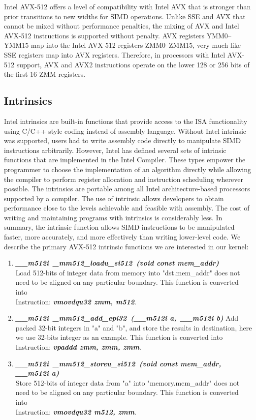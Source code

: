 \documentclass[sigconf]{acmart}
\begin{document}
Intel AVX-512 offers a level of compatibility with Intel AVX that is stronger than
prior transitions to new widths for SIMD operations. Unlike SSE and AVX that cannot
be mixed without performance penalties, the mixing of AVX and Intel AVX-512 instructions
is supported without penalty. AVX registers YMM0–YMM15 map into the Intel AVX-512 registers
ZMM0–ZMM15, very much like SSE registers map into AVX registers. Therefore, in processors with
Intel AVX-512 support, AVX and AVX2 instructions operate on the lower 128 or 256 bits of the first 16 ZMM registers.

\subsection{Intrinsics}
Intel intrinsics are built-in functions that provide access to the ISA functionality
using C/C++ style coding instead of assembly language. Without Intel intrinsic was
supported, users had to write assembly code directly to manipulate SIMD
instructions arbitrarily.
However, Intel has defined several sets of intrinsic functions that are implemented
in the Intel Compiler. These types empower the programmer to choose the implementation
of an algorithm directly while allowing the compiler to perform register allocation
and instruction scheduling wherever possible. The intrinsics are portable among all
Intel architecture-based processors supported by a compiler. The use of intrinsic
allows developers to obtain performance close to the levels achievable and feasible with assembly.
The cost of writing and maintaining programs with intrinsics is considerably less.
In summary, the intrinsic function allows SIMD instructions to be manipulated faster, more
accurately, and more effectively than writing lower-level code.
We describe the primary AVX-512 intrinsic functions we are interested in our kernel:

\begin{enumerate}
  \item \emph{\textbf{\textit{\_\_m512i\ \_mm512\_loadu\_si512\ (void const\* mem\_addr)}}} \\
  Load 512-bits of integer data from memory into "dst.mem\_addr" does not need to be aligned on any particular boundary.
  This function is converted into \\ Instruction: \emph{\textbf{\textit{vmovdqu32  zmm,  m512}}}.
  \item \emph{\textbf{\textit{\_\_m512i\ \_mm512\_add\_epi32\ (\_\_m512i a,\ \_\_m512i b)}}}
  Add packed 32-bit integers in "a" and "b", and store the results in destination, here we use 32-bits integer as an example.
  This function is converted into \\ Instruction: \emph{\textbf{\textit{vpaddd  zmm,  zmm,  zmm}}}.
  \item \emph{\textbf{\textit{\_\_m512i\ \_mm512\_storeu\_si512\ (void const\* mem\_addr, \_\_m512i a)}}} \\
  Store 512-bits of integer data from "a" into "memory.mem\_addr" does not need to be aligned on any particular boundary.
  This function is converted into \\ Instruction: \emph{\textbf{\textit{vmovdqu32  m512, zmm}}}.
\end{enumerate}
\end{document}
